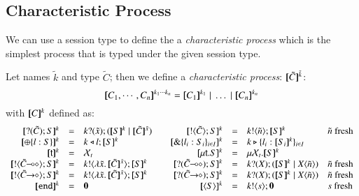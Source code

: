 \subsection{Characteristic Process}
We can use a session type to define the a {\em characteristic process}
which is the simplest process that is typed
under the given session type.
%
\begin{definition}\rm
	Let names $\tilde{k}$ and type $\tilde{C}$; then we define a {\em characteristic process}:
	$[\!\![\tilde{C}]\!\!]^{\tilde{k}}$:
	\[
		\map{C_1, \cdots, C_n}^{k_1 \cdots k_n} = \map{C_1}^{k_1} \Par \dots \Par \map{C_n}^{k_n}		
	\]
	with $[\!\![C]\!\!]^k$ defined as:
	\[
	\begin{array}{rclcrcll}
		\map{\btinp{\tilde{C}} S}^{k} &=& \binp{k}{\tilde{x}} (\map{S}^{k} \Par \map{\tilde{C}}^{\tilde{x}})
		&&
		\map{\btout{\tilde{C}} S}^{k} &=& \bout{k}{\tilde{n}} \map{S}^{k} & \tilde{n}\textrm{ fresh}
		\\

		\map{\btsel{l : S}}^{k} &=& \bsel{k}{l} \map{S}^{k}
		& &
		\map{\btbra{l_i: S_i}_{i \in I}}^{k} &=& \bbra{k}{l_i: \map{S_i}^{k}}_{i \in I}
		\\

		\map{\tvar{t}}^{k} &=& \rvar{X}_t
		& &
		\map{\trec{t}{S}}^{k} &=& \mu \rvar{X}_t.\map{S}^{k}
		\\

		\map{\btout{\lhot{\tilde{C}}} S}^{k} &=& \bout{k}{\abs{\tilde{x}}{\map{\tilde{C}}^{\tilde{x}}}} \map{S}^k
		& &
		\map{\btinp{\lhot{\tilde{C}}} S}^{k} &=& \binp{k}{X} (\map{S}^k \Par \appl{X}{\tilde{n}}) & \tilde{n}\textrm{ fresh}
		\\

		\map{\btout{\shot{\tilde{C}}} S}^{k} &=& \bout{k}{\abs{\tilde{x}}{\map{\tilde{C}}^{\tilde{x}}}} \map{S}^k
		& &
		\map{\btinp{\shot{\tilde{C}}} S}^{k} &=& \binp{k}{X} (\map{S}^k \Par \appl{X}{\tilde{n}}) & \tilde{n}\textrm{ fresh}
		\\


		\map{\tinact}^{k} &=& \inact
		&&
		\map{\chtype{S}}^{k} &=& \bout{k}{s} \inact &s\textrm{ fresh}%
	\end{array}
	\]
\end{definition}

